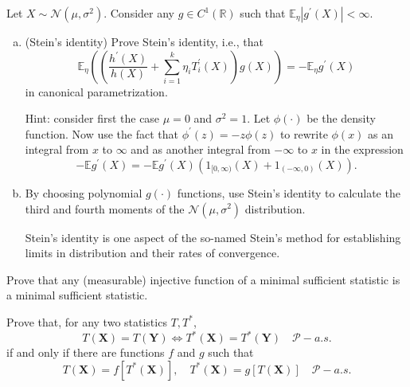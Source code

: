 \begin{exercise}
    Let \(X \sim \mathcal{N}\left(\mu, \sigma^{2}\right)\). Consider any \(g \in C^{1}(\mathbb{R})\) such that \(\mathbb{E}_{\eta}\left|g^{\prime}(X)\right|<\infty\). 
    \begin{enumerate}[(a)]
        \item (Stein's identity) Prove Stein's identity, i.e., that
        \[
        \mathbb{E}_{\eta}\left(\left(\frac{h^{\prime}(X)}{h(X)}+\sum_{i=1}^{k} \eta_{i} T_{i}^{\prime}(X)\right) g(X)\right)=-\mathbb{E}_{\eta} g^{\prime}(X)
        \]
        in canonical parametrization. 
        
        Hint: consider first the case \(\mu=0\) and \(\sigma^{2}=1\). Let \(\phi(\cdot)\) be the density function. Now use the fact that \(\phi^{\prime}(z)=-z \phi(z)\) to rewrite \(\phi(x)\) as an integral from \(x\) to \(\infty\) and as another integral from \(-\infty\) to \(x\) in the expression
        \[
            -\mathbb{E} g^{\prime}(X)=-\mathbb{E} g^{\prime}(X)\left(1_{[0, \infty)}(X)+1_{(-\infty, 0)}(X)\right). 
        \]
        \item By choosing polynomial \(g(\cdot)\) functions, use Stein's identity to calculate the third and fourth moments of the \(\mathcal{N}\left(\mu, \sigma^{2}\right)\) distribution.
        
         Stein's identity is one aspect of the so-named Stein's method for establishing limits in distribution and their rates of convergence.
    \end{enumerate}
\end{exercise}

\begin{exercise}
    Prove that any (measurable) injective function of a minimal sufficient statistic is a minimal sufficient statistic. 
\end{exercise}

\begin{exercise}
    Prove that, for any two statistics \(T, T^{*}\),
    \[
    T(\mathbf{X})=T(\mathbf{Y}) \Leftrightarrow T^{*}(\mathbf{X})=T^{*}(\mathbf{Y}) \quad \mathcal{P}-a.s.
    \]
    if and only if there are functions \(f\) and \(g\) such that
    \[
    T(\mathbf{X})=f\left[T^{*}(\mathbf{X})\right], \quad T^{*}(\mathbf{X})=g[T(\mathbf{X})] \quad \mathcal{P}-a.s.
    \]
\end{exercise}

